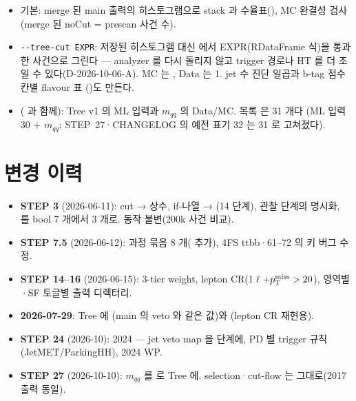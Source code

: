 \begin{impl}
\begin{itemize}
\item 기본: merge 된 main 출력의 히스토그램으로 stack 과 수율표(), MC 완결성 검사(merge 된 noCut = prescan 사건 수).
\item \texttt{-{}-tree-cut EXPR}: 저장된 히스토그램 대신  에서 EXPR(RDataFrame 식)을 통과한 사건으로 그린다 — analyzer 를 다시 돌리지 않고
      trigger 경로나 HT 를 더 조일 수 있다(D-2026-10-06-A). MC 는 , Data 는 1. jet 수 진단 일곱과 b-tag 점수 칸별 flavour 표
      ()도 만든다.
\item {}( 과 함께): Tree v1 의 ML 입력과 $m_{qq}$ 의 Data/MC. 목록  은 31 개다
      (ML 입력 30 + $m_{qq}$; STEP~27·CHANGELOG 의 예전 표기 32 는 31 로 고쳐졌다).
\end{itemize}
\end{impl}

\section{변경 이력}\label{sec:selection-history}
\begin{itemize}
\item \textbf{STEP 3} (2026-06-11):  cut →  상수, if-나열 → (14 단계), 관찰 단계의 명시화,
       를 bool 7 개에서 3 개로. 동작 불변(200k 사건 비교).
\item \textbf{STEP 7.5} (2026-06-12): 과정 묶음 8 개( 추가), 4FS ttbb·61–72 의 키 버그 수정.
\item \textbf{STEP 14–16} (2026-06-15): 3-tier weight, lepton CR(1$\ell$+$p_{\mathrm{T}}^{\mathrm{miss}}>20$), 영역별·SF 토글별 출력 디렉터리.
\item \textbf{2026-07-29}: Tree 에 (main 의 veto 와 같은 값)와 (lepton CR 재현용).
\item \textbf{STEP 24} (2026-10): 2024 — jet veto map 을  단계에, PD 별 trigger 규칙(JetMET/ParkingHH), 2024 WP.
\item \textbf{STEP 27} (2026-10-10): $m_{qq}$ 를  로 Tree 에. selection·cut-flow 는 그대로(2017 출력 동일).
\end{itemize}

